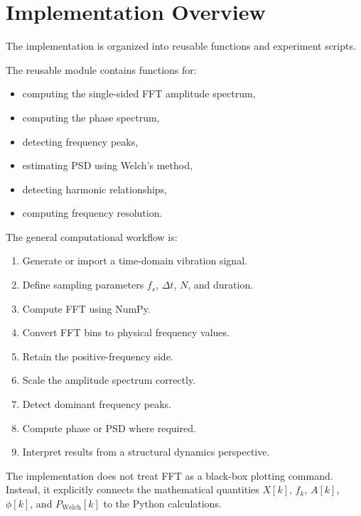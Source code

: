 \documentclass[11pt,a4paper]{article}
\begin{document}
\section{Implementation Overview}

The implementation is organized into reusable functions and experiment scripts.

The reusable module contains functions for:

\begin{itemize}
    \item computing the single-sided FFT amplitude spectrum,
    \item computing the phase spectrum,
    \item detecting frequency peaks,
    \item estimating PSD using Welch's method,
    \item detecting harmonic relationships,
    \item computing frequency resolution.
\end{itemize}

The general computational workflow is:

\begin{enumerate}
    \item Generate or import a time-domain vibration signal.
    \item Define sampling parameters \(f_s\), \(\Delta t\), \(N\), and duration.
    \item Compute FFT using NumPy.
    \item Convert FFT bins to physical frequency values.
    \item Retain the positive-frequency side.
    \item Scale the amplitude spectrum correctly.
    \item Detect dominant frequency peaks.
    \item Compute phase or PSD where required.
    \item Interpret results from a structural dynamics perspective.
\end{enumerate}

The implementation does not treat FFT as a black-box plotting command. Instead, it explicitly connects the mathematical quantities \(X[k]\), \(f_k\), \(A[k]\), \(\phi[k]\), and \(P_{\text{Welch}}[k]\) to the Python calculations.

\end{document}
